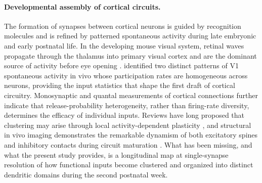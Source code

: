 \paragraph{Developmental assembly of cortical circuits.}
The formation of synapses between cortical neurons is guided by recognition molecules \citep{sanes2020synaptic} and is refined by patterned spontaneous activity during late embryonic and early postnatal life. In the developing mouse visual system, retinal waves propagate through the thalamus into primary visual cortex and are the dominant source of activity before eye opening \citep{ackman2012retinal}. \citet{siegel2012peripheral} identified two distinct patterns of V1 spontaneous activity in vivo whose participation rates are homogeneous across neurons, providing the input statistics that shape the first draft of cortical circuitry. Monosynaptic and quantal measurements of cortical connections \citep{markram1997physiology,silver2003high} further indicate that release-probability heterogeneity, rather than firing-rate diversity, determines the efficacy of individual inputs. Reviews have long proposed that clustering may arise through local activity-dependent plasticity \citep{winnubst2012synaptic}, and structural in vivo imaging demonstrates the remarkable dynamism of both excitatory spines and inhibitory contacts during circuit maturation \citep{villa2016inhibitory,kasai2023mechanical}. What has been missing, and what the present study provides, is a longitudinal map at single-synapse resolution of how functional inputs become clustered and organized into distinct dendritic domains during the second postnatal week.
